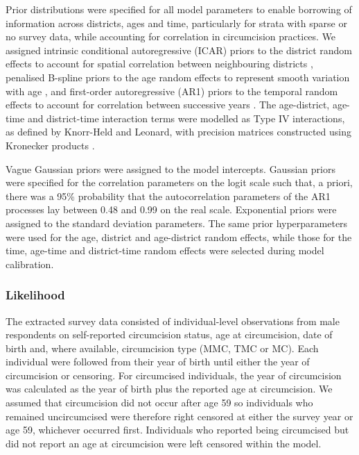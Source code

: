 \documentclass{article}
\begin{document}

Prior distributions were specified for all model parameters to enable borrowing of information across districts, ages and time, particularly for strata with sparse or no survey data, while accounting for correlation in circumcision practices. We assigned intrinsic conditional autoregressive (ICAR) priors to the district random effects to account for spatial correlation between neighbouring districts \cite{besag1995conditional}, penalised B-spline priors to the age random effects to represent smooth variation with age \cite{wood2017generalized}, and first-order autoregressive (AR1) priors to the temporal random effects to account for correlation between successive years \cite{shumway2000time}. The age-district, age-time and district-time interaction terms were modelled as Type IV interactions, as defined by Knorr-Held and Leonard, with precision matrices constructed using Kronecker products \cite{knorr2000bayesian}.

Vague Gaussian priors were assigned to the model intercepts. Gaussian priors were specified for the correlation parameters on the logit scale such that, a priori, there was a 95\% probability that the autocorrelation parameters of the AR1 processes lay between 0.48 and 0.99 on the real scale. Exponential priors were assigned to the standard deviation parameters. The same prior hyperparameters were used for the age, district and age-district random effects, while those for the time, age-time and district-time random effects were selected during model calibration. 


\subsubsection*{Likelihood}


The extracted survey data consisted of individual-level observations from male respondents on self-reported circumcision status, age at circumcision, date of birth and, where available, circumcision type (MMC, TMC or MC). Each individual were followed from their year of birth until either the year of circumcision or censoring. For circumcised individuals, the year of circumcision was calculated as the year of birth plus the reported age at circumcision. We assumed that circumcision did not occur after age 59 so individuals who remained uncircumcised were therefore right censored at either the survey year or age 59, whichever occurred first. Individuals who reported being circumcised but did not report an age at circumcision were left censored within the model. 
\end{document}
